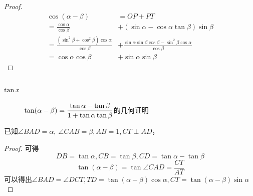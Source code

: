 \begin{proof}
\begin{align*}
    \cos(\alpha - \beta)&=OP + PT\\
    =\frac{\cos\alpha}{\cos\beta} &+ (\sin\alpha -\cos\alpha\tan\beta)\sin\beta
    \\=\frac{(\sin^2\beta + \cos^2\beta)\cos\alpha}{\cos\beta}&+\frac{\sin\alpha\sin\beta\cos\beta - \sin^2\beta\cos\alpha}{\cos\beta}
     \\=\cos\alpha\cos\beta &+ \sin\alpha\sin\beta
\end{align*}




\end{proof}

\subsubsection{\(\protect\tan x\)}

\begin{figure}[H]
    \centering
    \caption{\(\displaystyle\tan(\alpha-\beta) = \frac{\tan\alpha-\tan\beta}{1+\tan\alpha\tan\beta}\)的几何证明}
    \label{fig:enter-la}
\end{figure}

已知\(\angle BAD = \alpha,\ \angle CAB=\beta, AB=1, CT\perp AD\)，
\begin{proof}
可得\[
DB = \tan\alpha,CB=\tan\beta,CD=\tan\alpha - \tan\beta
\]
\[
\tan(\alpha - \beta) = \tan\angle CAD=\frac{CT}{AT}
\]
可以得出\(\angle BAD = \angle DCT, TD = \tan(\alpha - \beta)\cos\alpha, CT = \tan(\alpha - \beta)\sin\alpha\)
\end{proof}

